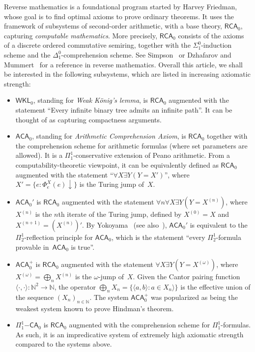 \documentclass{article}
\newcommand{\RCA}[0]{\mathsf{RCA}}
\newcommand{\WKL}[0]{\mathsf{WKL}}
\newcommand{\ACA}[0]{\mathsf{ACA}}
\newcommand{\PIOOCA}[0]{\Pi^1_1\mathsf{-CA}}
\newcommand{\NN}[0]{\mathbb{N}}
\def\qt#1{``#1''}%
\numberwithin{theorem}{section}
\theoremstyle{definition}
\begin{document}
Reverse mathematics is a foundational program started by Harvey Friedman, whose goal is to find optimal axioms to prove ordinary theorems. It uses the framework of subsystems of second-order arithmetic, with a base theory, $\RCA_0$, capturing \emph{computable mathematics}. More precisely, $\RCA_0$ consists of the axioms of a discrete ordered commutative semiring, together with the $\Sigma^0_1$-induction scheme and the $\Delta^0_1$-comprehension scheme. See Simpson~\cite{simpson2009subsystems} or Dzhafarov and Mummert~\cite{dzhafarov2022reverse} for a reference in reverse mathematics. Overall this article, we shall be interested in the following subsystems, which are listed in increasing axiomatic strength:
\begin{itemize}
    \item $\WKL_0$, standing for \emph{Weak K\"onig's lemma}, is $\RCA_0$ augmented with the statement \qt{Every infinite binary tree admits an infinite path}. It can be thought of as capturing compactness arguments.
    \item $\ACA_0$, standing for \emph{Arithmetic Comprehension Axiom}, is $\RCA_0$ together with the comprehension scheme for arithmetic formulas (where set parameters are allowed). It is a $\Pi^1_1$-conservative extension of  Peano arithmetic. From a computability-theoretic viewpoint, it can be equivalently defined as $\RCA_0$ augmented with the statement \qt{$\forall X \exists Y (Y = X')$}, where $X' = \{ e : \Phi^X_e(e)\downarrow \}$ is the Turing jump of~$X$.
    \item $\ACA_0'$ is $\RCA_0$ augmented with the statement $\forall n \forall X \exists Y (Y = X^{(n)})$,
    where $X^{(n)}$ is the $n$th iterate of the Turing jump, defined by $X^{(0)} = X$ and $X^{(n+1)} = (X^{(n)})'$.
    By Yokoyama~\cite{yokoyama2023paris} (see also~\cite{pacheco2022determinacy}), $\ACA_0'$ is equivalent to the $\Pi^1_2$-reflection principle for $\ACA_0$, which is the statement \qt{every $\Pi^1_2$-formula provable in~$\ACA_0$ is true}.
    \item $\ACA_0^+$ is $\RCA_0$ augmented with the statement $\forall X \exists Y (Y = X^{(\omega)})$, where $X^{(\omega)} = \bigoplus_n X^{(n)}$ is the $\omega$-jump of~$X$. Given the Cantor pairing function $\langle \cdot, \cdot \rangle : \NN^2 \to \NN$, the operator $\bigoplus_n X_n = \{ \langle a, b \rangle : a \in X_n \rangle \}$ is the effective union of the sequence $(X_n)_{n \in \NN}$. The system $\ACA_0^+$ was popularized as being the weakest system known to prove Hindman's theorem.
    \item $\PIOOCA_0$ is $\RCA_0$ augmented with the comprehension scheme for $\Pi^1_1$-formulas. As such, it is an impredicative system of extremely high axiomatic strength compared to the systems above.
\end{itemize}
\end{document}
